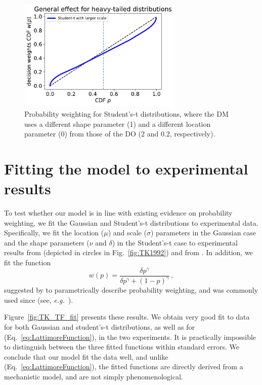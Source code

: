 \documentclass[a4paper, 12pt]{article}
\newcommand{\elabel}[1]{\label{eq:#1}}
\newcommand{\eref}[1]{(Eq.~\ref{eq:#1})}
\newcommand{\flabel}[1]{\label{fig:#1}}
\newcommand{\fref}[1]{Fig.~\ref{fig:#1}}
\newcommand{\Fref}[1]{Figure~\ref{fig:#1}}
\newcommand{\eg}{{\it e.g.}\ }
\newcommand{\be}{\begin{equation}}
\newcommand{\ee}{\end{equation}}
\begin{document}
\begin{figure}[htb]
\centering
\includegraphics[width=0.7\textwidth]{./figs/Student-t.pdf}
\caption{Probability weighting for Student's-t distributions, where the DM uses a different shape parameter (1) and a different location parameter (0) from those of the DO (2 and 0.2, respectively).}
\flabel{fat_tailed_CDF}
\end{figure}

\section{Fitting the model to experimental results}
To test whether our model is in line with existing evidence on probability weighting, we fit the Gaussian and Student's-t distributions to experimental data. Specifically, we fit the location ($\mu$) and scale ($\sigma$) parameters in the Gaussian case and the shape parameters ($\nu$ and $\delta$) in the Student's-t case to experimental results from \cite{TverskyKahneman1992} (depicted in circles in \fref{TK1992}) and from \cite{TverskyFox1995}. In addition, we fit the function
%
\be
w(p)=\frac{\delta p^{\gamma}}{\delta p^{\gamma} + (1-p)^{\gamma}}\,,
\elabel{LattimoreFunction}
\ee
%
suggested by \cite{LattimoreBakerWitte1992} to parametrically describe probability weighting, and was commonly used since (see, \eg \cite{tversky1995risk}).

\Fref{TK_TF_fit} presents these results. We obtain very good fit to data for both Gaussian and student's-t distributions, as well as for \eref{LattimoreFunction}, in the two experiments. It is practically impossible to distinguish between the three fitted functions within standard errors. We conclude that our model fit the data well, and unlike \eref{LattimoreFunction}, the fitted functions are directly derived from a mechanistic model, and are not simply phenomenological.
\end{document}
